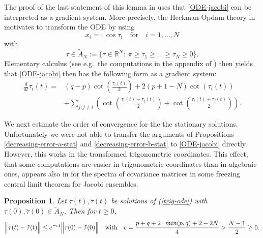 \documentclass[reqno]{amsart}
\theoremstyle{plain}
\newtheorem{proposition}[theorem]{Proposition}
\theoremstyle{definition}
\numberwithin{equation}{section}
\begin{document}
  The proof of the last statement of this lemma in  \cite{AVW} uses that \eqref{ODE-jacobi} can be interpreted as a gradient system. More precisely,
  the Heckman-Opdam theory in \cite{HO, HeS} motivates to transform the ODE by using
  $$x_i=:\cos \tau_i \quad\text{for}\quad i=1,\ldots,N$$
  with
  $$\tau\in\tilde A_N:=\{ \tau\in \mathbb R^N: \> 
  \pi\ge \tau_1\ge\ldots\ge \tau_N\ge0\}.$$
Elementary calculus (see e.g.~the computations in  the appendix of \cite{AVW}) then yields that  \eqref{ODE-jacobi} then has the following form as a gradient system:
   \begin{equation}\label{trig-ode}
        \begin{split}
        \frac{d}{dt} \tau_i(t)=&
           (q-p)\cot\left(\frac{\tau_i(t)}{2}\right)+2(p+1-N) \cot(\tau_i(t))\\
          &+\sum_{j: j\ne i}\left(\cot\left(\frac{\tau_i(t)-\tau_j(t)}{2}\right)+
          \cot\left(\frac{\tau_i(t)+\tau_j(t)}{2}\right)\right).
          \end{split}
          \end{equation}
 

We next  estimate the order  of convergence for the the stationary solutions.
Unfortunately we were not able to transfer the arguments of Propositions 
\ref{decreasing-error-a-stat} and  \ref{decreasing-error-b-stat} to  \eqref{ODE-jacobi} directly.
However,  this works in the  transformed trigonometric coordinates.
This effect, that some computations are easier in trigonometric coordinates than in algebraic ones,
appears also in \cite{HV} for the spectra of covariance matrices in some freezing central limit theorem for Jacobi ensembles.


 \begin{proposition}\label{decreasing-error-jacobi-stat-trigono}
  Let  $\tau(t),\tilde \tau(t)$ be solutions of (\ref{trig-ode}) with $\tau(0),\tilde \tau(0)\in \tilde A_N$.
Then for $t\ge0$,
$$\Bigl\|\tau(t)-\tilde \tau(t)\Bigr\|\le  e^{- c  t}\Bigl\|\tau(0)-\tilde \tau(0)\Bigr\|  \quad\text{with}\quad
c=\frac{p+q+2\cdot min(p,q)+2-2N}{4}>\frac{N-1}{2}\ge0.$$ 
  \end{proposition}
\end{document}
